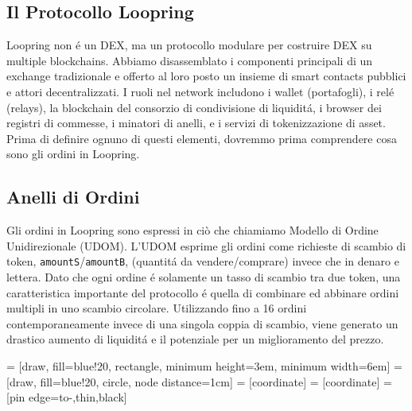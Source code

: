 \documentclass[UTF8,nofonts]{article}
\makeatletter
\newenvironment{figurehere}
 {\def\@captype{figure}}
 {}
\makeatother
\begin{document}
\begin{multicols}{2}
\section{Il Protocollo Loopring\label{sec:loopring_protocol}}
Loopring non \'e un DEX, ma un protocollo modulare per costruire DEX su multiple blockchains. Abbiamo disassemblato i componenti principali di un exchange tradizionale e offerto al loro posto un insieme di smart contacts pubblici e attori decentralizzati. I ruoli nel network  includono i wallet (portafogli), i rel\'e (relays), la blockchain del consorzio di condivisione di liquidit\'a, i browser dei registri di commesse, i minatori di anelli, e i servizi di tokenizzazione di asset. Prima di definire ognuno di questi elementi, dovremmo prima comprendere cosa sono gli ordini in Loopring.

\subsection{Anelli di Ordini\label{sec:order_ring}}
Gli ordini in Loopring sono espressi in ciò che chiamiamo Modello di Ordine Unidirezionale (UDOM)\cite{coinport2014udom}. L'UDOM esprime gli ordini come richieste di scambio di token, \verb|amountS|/\verb|amountB|, (quantit\'a da vendere/comprare) invece che in denaro e lettera. Dato che ogni ordine \'e solamente un tasso di scambio tra due token, una caratteristica importante del protocollo \'e quella di combinare ed abbinare ordini multipli in uno scambio circolare. Utilizzando fino a 16 ordini contemporaneamente invece di una singola coppia di scambio, viene generato un drastico aumento di liquidit\'a e il potenziale per un miglioramento del prezzo.

\begin{center}
\begin{figurehere}
\centering
{} = [draw, fill=blue!20, rectangle,
    minimum height=3em, minimum width=6em]
 = [draw, fill=blue!20, circle, node distance=1cm]
 = [coordinate]
 = [coordinate]
 = [pin edge={to-,thin,black}]

\begin{tikzpicture}[
    auto,
    node distance=2cm,
    >=latex',
    font=\bfseries\footnotesize\sffamily,
    order/.style={
		scale=0.7,
		rectangle,
		rounded corners,
		draw=black,
		text centered,
		minimum height=12mm,
		fill=white
	},
	label/.style={
		scale=0.7
	}
  ]


\end{tikzpicture}
\end{figurehere}
\end{center}
\end{multicols}
\end{document}
